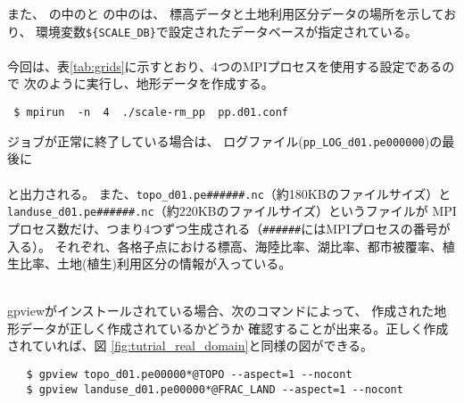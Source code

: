 また、
の中のと
の中のは、
標高データと土地利用区分データの場所を示しており、
環境変数\verb|${SCALE_DB}|で設定されたデータベースが指定されている。\\

\\


今回は、表\ref{tab:grids}に示すとおり、4つのMPIプロセスを使用する設定であるので
次のように実行し、地形データを作成する。
\begin{verbatim}
 $ mpirun  -n  4  ./scale-rm_pp  pp.d01.conf
\end{verbatim}
ジョブが正常に終了している場合は、
ログファイル(\verb|pp_LOG_d01.pe000000|)の最後に\\

\\

\noindent
と出力される。
また、\verb|topo_d01.pe######.nc|（約180KBのファイルサイズ）と\\
\verb|landuse_d01.pe######.nc|（約220KBのファイルサイズ）というファイルが
MPIプロセス数だけ、つまり4つずつ生成される（\verb|######|にはMPIプロセスの番号が入る）。
それぞれ、各格子点における標高、海陸比率、湖比率、都市被覆率、植生比率、土地(植生)利用区分の情報が入っている。


 \vspace{1cm}
  \hrulefill \\
 gpviewがインストールされている場合、次のコマンドによって、
 作成された地形データが正しく作成されているかどうか
 確認することが出来る。正しく作成されていれば、図 \ref{fig:tutrial_real_domain}と同様の図ができる。
 \begin{verbatim}
   $ gpview topo_d01.pe00000*@TOPO --aspect=1 --nocont
   $ gpview landuse_d01.pe00000*@FRAC_LAND --aspect=1 --nocont
 \end{verbatim}

